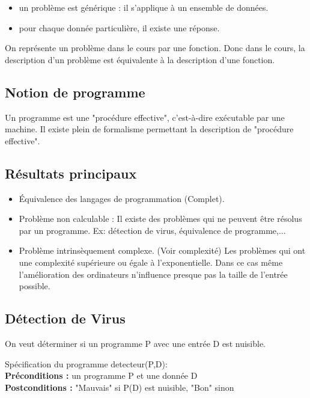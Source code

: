 \begin{itemize}
	\item un problème est générique : il s'applique à un ensemble de données.
	\item pour chaque donnée particulière, il existe une réponse.
\end{itemize}
On représente un problème dans le cours par une fonction. Donc dans le cours,
la description d'un problème est équivalente à la description d'une fonction.

\subsection{Notion de programme}
\label{ssub:notion_de_programme}

Un programme est une "procédure effective", c'est-à-dire exécutable par une machine.
Il existe plein de formalisme permettant la description de "procédure effective".


\subsection{Résultats principaux}
\label{sub:r_sultat_principaux}

\begin{itemize}
	\item Équivalence des langages de programmation (Complet).
	\item Problème non calculable : Il existe des problèmes qui ne peuvent 
		être résolus par un programme. Ex: détection de virus, équivalence
		de programme,...
	\item Problème intrinsèquement complexe. (Voir complexité) Les problèmes
		qui ont une complexité supérieure ou égale à l'exponentielle. Dans
		ce cas même l'amélioration des ordinateurs n'influence presque pas
		la taille de l'entrée possible.
\end{itemize}


\subsection{Détection de Virus}
\label{sub:d_tection_de_virus}
On veut déterminer si un programme P avec une entrée D est nuisible.

Spécification du programme detecteur(P,D):\\
\textbf{Préconditions :} un programme P et une donnée D\\
\textbf{Postconditions :} "Mauvais" si P(D) est nuisible,
		"Bon" sinon

